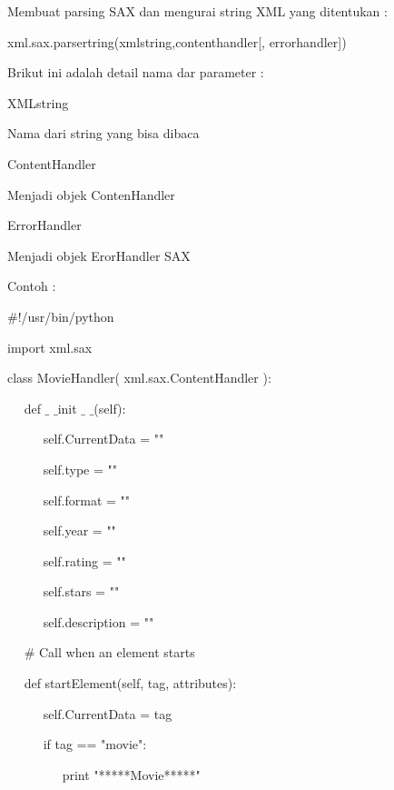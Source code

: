  \par
Membuat parsing SAX dan mengurai string XML yang ditentukan : \par
\vspace{12pt}
{\fontsize{10pt}{10pt}\selectfont xml.sax.parsertring(xmlstring,contenthandler[, errorhandler])} \par
\vspace{12pt}
Brikut ini adalah detail nama dar parameter : \par
\noindent 
{XMLstring} \par
Nama dari string yang bisa dibaca \par
\noindent 
{ContentHandler} \par
Menjadi objek ContenHandler \par
\noindent 
{ErrorHandler} \par
Menjadi objek ErorHandler SAX \par
\vspace{12pt}
\noindent 
Contoh : \par
\noindent 
 $  \#  $!/usr/bin/python \par
\vspace{12pt}
\noindent 
import xml.sax \par
\vspace{12pt}
\noindent 
class MovieHandler( xml.sax.ContentHandler ): \par
\noindent 
~~ def  $  \_  $ $  \_  $init $  \_  $ $  \_  $(self): \par
\noindent 
~~~~~ self.CurrentData = "" \par
\noindent 
~~~~~ self.type = "" \par
\noindent 
~~~~~ self.format = "" \par
\noindent 
~~~~~ self.year = "" \par
\noindent 
~~~~~ self.rating = "" \par
\noindent 
~~~~~ self.stars = "" \par
\noindent 
~~~~~ self.description = "" \par
\vspace{12pt}
\noindent 
~~  $  \#  $ Call when an element starts \par
\noindent 
~~ def startElement(self, tag, attributes): \par
\noindent 
~~~~~ self.CurrentData = tag \par
\noindent 
~~~~~ if tag == "movie": \par
\noindent 
~~~~~~~~ print "*****Movie*****" \par
\noindent 
